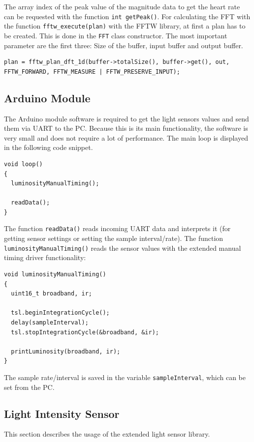 \documentclass[notitlepage]{scrreprt}
\begin{document}
The array index of the peak value of the magnitude data to get the heart rate can be requested with the function \lstinline{int getPeak()}. For calculating the FFT with the function \lstinline{fftw_execute(plan)} with the FFTW library, at first a plan has to be created. This is done in the \lstinline{FFT} class constructor. The most important parameter are the first three: Size of the buffer, input buffer and output buffer.

\begin{lstlisting}[caption=FFT.c]
plan = fftw_plan_dft_1d(buffer->totalSize(), buffer->get(), out, FFTW_FORWARD, FFTW_MEASURE | FFTW_PRESERVE_INPUT);
\end{lstlisting}

\subsection{Arduino Module}
The Arduino module software is required to get the light sensors values and send them via UART to the PC. Because this is its main functionality, the software is very small and does not require a lot of performance. The main loop is displayed in the following code snippet.

\begin{lstlisting}
void loop()
{ 
  luminosityManualTiming();
  
  readData();
}
\end{lstlisting}

The function \lstinline{readData()} reads incoming UART data and interprets it (for getting sensor settings or setting the sample interval/rate). The function \lstinline{luminosityManualTiming()} reads the sensor values with the extended manual timing driver functionality:

\newpage

\begin{lstlisting}
void luminosityManualTiming()
{
  uint16_t broadband, ir;
  
  tsl.beginIntegrationCycle();
  delay(sampleInterval);
  tsl.stopIntegrationCycle(&broadband, &ir);
  
  printLuminosity(broadband, ir);
}
\end{lstlisting}

The sample rate/interval is saved in the variable \lstinline{sampleInterval}, which can be set from the PC.

\subsection{Light Intensity Sensor}
This section describes the usage of the extended light sensor library.
\end{document}
